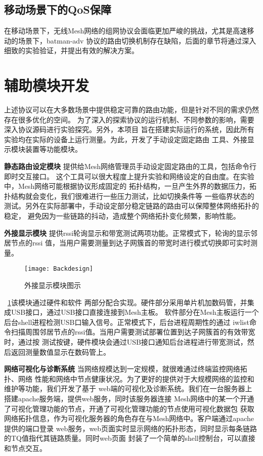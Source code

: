 \subsection{移动场景下的QoS保障}
    在移动场景下，无线Mesh网络的组网协议会面临更加严峻的挑战，尤其是高速移动的场景下，batman-adv
协议的路由切换机制存在缺陷，后面的章节将通过深入细致的实验验证，并提出有效的解决方案。

\section{辅助模块开发}
上述协议可以在大多数场景中提供稳定可靠的路由功能，但是针对不同的需求仍然存在很多优化的空间。
为了深入的探索协议的运行机制、不同参数的影响，需要深入协议源码进行实验探究。另外，本项目
旨在搭建实际运行的系统，因此所有实验均在实际的设备上运行测量。为此，开发了手动设定固定路由
工具、外接显示模块装置等功能模块。

\textbf{静态路由设定模块} 提供给Mesh网络管理员手动设定固定路由的工具，包括命令行即时交互接口。
这个工具可以很大程度上提升实验和网络设定的自由度。在实验中，Mesh网络可能根据协议形成固定的
拓扑结构，一旦产生外界的数据压力，拓扑结构就会变化，我们很难进行一些压力测试，比如切换条件等
一些临界状态的测试。另外在实际部署中，手动设定部分稳定链路的路由可以保障整体网络拓扑的稳定，
避免因为一些链路的抖动，造成整个网络拓扑变化频繁，影响性能。

\textbf{外接显示模块} 提供rssi轮询显示和带宽测试两项功能。正常模式下，轮询的显示邻居节点的rssi
值，当用户需要测量到达子网簇首的带宽时进行模式切换即可实时测量。

\begin{figure}[H]
  \centering
  \texttt{[image: Backdesign]}
  \caption{外接显示模块图示}
  \label{fig:backdesign}
\end{figure}

~\ref{fig:backdesign}该模块通过硬件和软件
两部分配合实现。硬件部分采用单片机加数码管，并集成USB接口，通过USB接口直接连接到Mesh主板。
软件部分在Mesh主板运行一个后台shell进程检测USB口输入信号。正常模式下，后台进程周期性的通过
iwlist命令扫描周围邻居节点的rssi值。当用户需要测试部署位置到达子网簇首的有效带宽时，通过按
测试按键，硬件模块会通过USB接口通知后台进程进行带宽测试，然后返回测量数值显示在数码管上。

\textbf{网络可视化与诊断系统} 当网络规模达到一定规模，就很难通过终端监控网络拓扑、网络
性能和网络中节点健康状况。为了更好的提供对于大规模网络的监控和维护等功能，我们开发了基于
web端的可视化及诊断系统。我们在一台服务器上搭建apache服务端，提供web服务，同时该服务器连接
Mesh网络中的某一个开通了可视化管理功能的节点，开通了可视化管理功能的节点使用可视化数据包
获取网络拓扑信息，作为可视化服务器的角色存在与Mesh网络中。客户端通过apache提供的端口登录
web服务，web页面实时显示网络的拓扑形态，同时显示每条链路的TQ值指代其链路质量。同时web页面
封装了一个简单的shell控制台，可以直接和节点交互。














